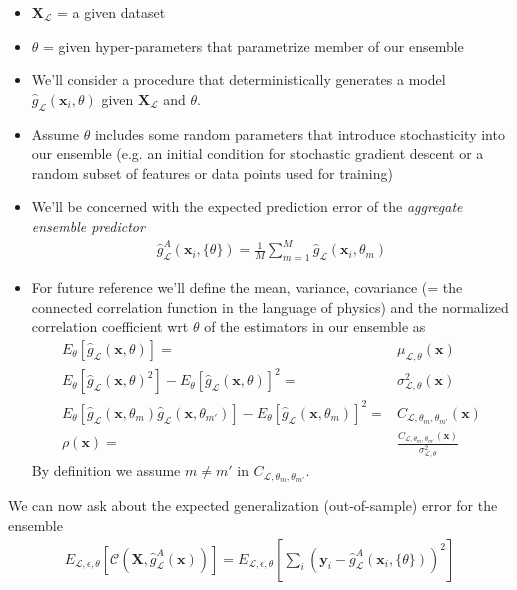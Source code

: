\documentclass[norsk,a4paper,11pt]{article}
\begin{document}
\begin{itemize}
	\item $\bm{X}_\mathcal{L}$ = a given dataset
	\item $\theta$ = given hyper-parameters that parametrize member of our ensemble
	\item We'll consider a procedure that deterministically generates a model $\hat{g}_\mathcal{L} (\bm{x}_i , \theta)$ given $\bm{X}_\mathcal{L}$ and $\theta$.
	\item Assume $\theta$ includes some random parameters that introduce stochasticity into our ensemble (e.g. an initial condition for stochastic gradient descent or a random subset of features or data points used for training)
	\item We'll be concerned with the expected prediction error of the \textit{aggregate ensemble predictor}
	\begin{align}
		\hat{g}_\mathcal{L}^A (\bm{x}_i, \{ \theta \}) = \frac{1}{M} \sum_{m=1}^M \hat{g}_\mathcal{L} (\bm{x}_i , \theta_m)
	\end{align}
	\item For future reference we'll define the mean, variance, covariance (= the connected correlation function in the language of physics) and the normalized correlation coefficient wrt $\theta$ of the estimators in our ensemble as
	\begin{align}
		E_\theta [\hat{g}_\mathcal{L} (\bm{x} , \theta)] =& \mu_{\mathcal{L}, \theta} (\bm{x}) \nonumber \\
		E_\theta [\hat{g}_\mathcal{L} (\bm{x} , \theta)^2] - E_\theta [\hat{g}_\mathcal{L} (\bm{x} , \theta)]^2 =& \sigma_{\mathcal{L}, \theta}^2 (\bm{x}) \nonumber \\
		E_\theta [ \hat{g}_\mathcal{L} (\bm{x} , \theta_m) \hat{g}_\mathcal{L} (\bm{x} , \theta_{m'})] - E_\theta [\hat{g}_\mathcal{L} (\bm{x} , \theta_m)]^2 =& C_{\mathcal{L}, \theta_m, \theta_{m'}} (\bm{x}) \nonumber \\
		\rho(\bm{x}) =& \frac{C_{\mathcal{L}, \theta_m, \theta_{m'}} (\bm{x})}{\sigma_{\mathcal{L}, \theta}^2}
	\end{align}
	By definition we assume $m \neq m'$ in $C_{\mathcal{L}, \theta_m, \theta_{m'}}$.
\end{itemize}
We can now ask about the expected generalization (out-of-sample) error for the ensemble
\begin{align}
	E_{\mathcal{L}, \epsilon, \theta} [\mathcal{C} (\bm{X}, \hat{g}_\mathcal{L}^A (\bm{x}))] = E_{\mathcal{L}, \epsilon, \theta} [\sum_i (\bm{y}_i - \hat{g}_\mathcal{L}^A (\bm{x}_i, \{ \theta\}))^2]
\end{align}
\end{document}
